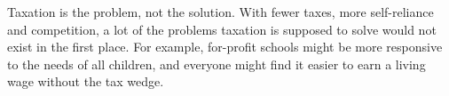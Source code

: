 Taxation is the problem, not the solution. With fewer taxes, more self-reliance and competition, a lot of the problems taxation is supposed to solve would not exist in the first place. For example, for-profit schools might be more responsive to the needs of all children, and everyone might find it easier to earn a living wage without the tax wedge.
